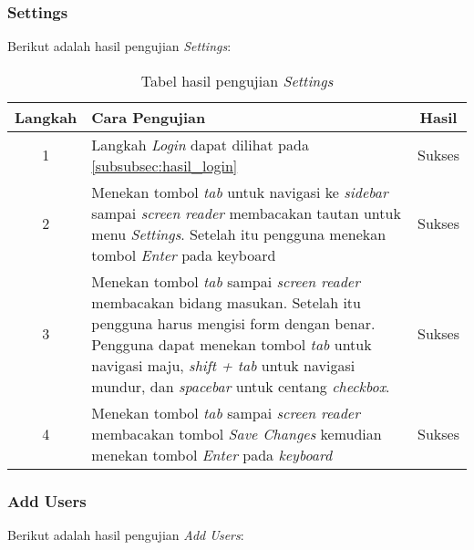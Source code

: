 \subsubsection{Settings}
\label{subsubsec:hasil_settings}
Berikut adalah hasil pengujian \textit{Settings}:

\begin{table}[H]
	\centering
	\caption{Tabel hasil pengujian \textit{Settings}}
	\label{tab:hasil_settings}
	\begin{tabular}{|c|p{12cm}|c|}
		\toprule
		Langkah & Cara Pengujian & Hasil \\
		\midrule
		1 & Langkah \textit{Login} dapat dilihat pada \ref{subsubsec:hasil_login} & Sukses\\
		2 & Menekan tombol \textit{tab} untuk navigasi ke \textit{sidebar} sampai \textit{screen reader} membacakan tautan untuk menu \textit{Settings}. Setelah itu pengguna menekan tombol \textit{Enter} pada keyboard & Sukses\\
		3 & Menekan tombol \textit{tab} sampai \textit{screen reader} membacakan bidang masukan. Setelah itu pengguna harus mengisi form dengan benar. Pengguna dapat menekan tombol \textit{tab} untuk navigasi maju, \textit{shift + tab} untuk navigasi mundur, dan \textit{spacebar} untuk centang \textit{checkbox}. & Sukses\\
		4 & Menekan tombol \textit{tab} sampai \textit{screen reader} membacakan tombol \textit{Save Changes} kemudian menekan tombol \textit{Enter} pada \textit{keyboard} & Sukses\\
		\bottomrule
	\end{tabular}
\end{table}

\subsubsection{Add Users}
\label{subsubsec:hasil_add_users}
Berikut adalah hasil pengujian \textit{Add Users}:

